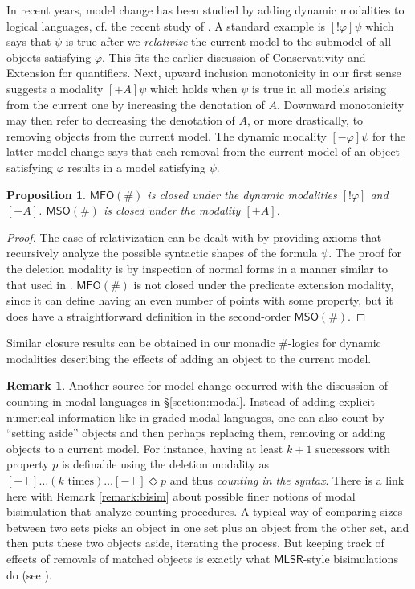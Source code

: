 \documentclass[12pt,oneside,reqno]{amsart}
\newtheorem{proposition}{Proposition}
\theoremstyle{definition}
\newtheorem{remark}{Remark}
\begin{document}
In recent years, model change has been studied by adding dynamic modalities to logical languages, cf. the recent study of \cite{mlsr}. A standard example is $[!\varphi]\psi$ which says that $\psi$ is true after we \emph{relativize} the current model to the submodel of all objects satisfying $\varphi$. This fits the earlier discussion of Conservativity and Extension for quantifiers. Next, upward inclusion monotonicity in our first sense  suggests a modality $[+A]\psi$ which holds when $\psi$ is true in all models arising from the current one by increasing the denotation of $A$. Downward monotonicity may then refer to decreasing the denotation of $A$, or more drastically, to removing objects from the current model. The dynamic modality $[-\varphi]\psi$ for the latter model change says that each removal from the current model of an object satisfying $\varphi$ results in a model satisfying $\psi$.

\begin{proposition} $\mathsf{MFO(\#)}$ is closed under the dynamic modalities $[!\varphi]$ and $[-A]$. $\mathsf{MSO(\#)}$ is closed under the modality $[+A]$.
\end{proposition}
\begin{proof} The case of relativization can be dealt with by providing axioms that recursively analyze the possible syntactic shapes of the formula $\psi$. The proof for the deletion modality is by inspection of normal forms in a manner similar to that used in \cite[Thm. 6.1]{mlsr}. $\mathsf{MFO(\#)}$ is not closed under the predicate extension modality, since it can define having an even number of points with some property, but it does have a straightforward definition in the second-order $\mathsf{MSO(\#)}$. 
\end{proof}

Similar closure results can be obtained in our monadic $\#$-logics for dynamic modalities describing the effects of adding an object to the current model. 

\begin{remark} \label{remark:mlsr}
Another source for model change occurred with the discussion of  counting in modal languages in \S\ref{section:modal}. Instead of adding explicit numerical information like in graded modal languages, one can also count by ``setting  aside'' objects and then perhaps replacing them, removing or adding objects to a current model. For instance, having at  least $k+1$ successors with property $p$ is  definable using the deletion modality as $[-\top]\dots (k  \mbox{ times}) \dots[-\top]\Diamond p$ and thus \emph{counting in the syntax}. There is a link here with Remark \ref{remark:bisim} about possible finer notions of modal bisimulation that analyze counting procedures. A typical way of comparing sizes between two sets  picks an object in one set plus an  object from the other set, and then puts these two objects aside, iterating the process. But keeping track of  effects of removals of matched objects is exactly what  $\mathsf{MLSR}$-style bisimulations do (see \citealt{mlsr}). 
\end{remark}
\end{document}
